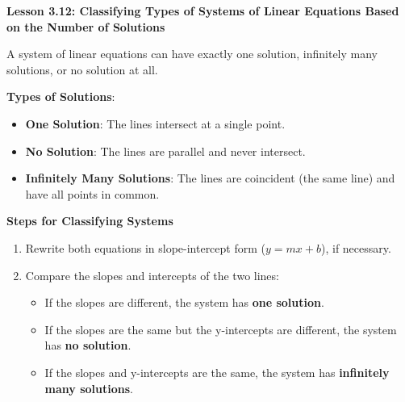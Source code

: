  \begin{center}
\textbf{Lesson 3.12: Classifying Types of Systems of Linear Equations Based on the Number of Solutions}
\end{center}

\vspace*{-2ex}

A system of linear equations can have exactly one solution, infinitely many solutions, or no solution at all.

\noindent\textbf{Types of Solutions}:
    \begin{itemize}
        \item \textbf{One Solution}: The lines intersect at a single point.
        \item \textbf{No Solution}: The lines are parallel and never intersect.
        \item \textbf{Infinitely Many Solutions}: The lines are coincident (the same line) and have all points in common.
    \end{itemize}

\noindent\textbf{Steps for Classifying Systems}

\begin{enumerate}
    \item Rewrite both equations in slope-intercept form ($y = mx + b$), if necessary.
    \item Compare the slopes and intercepts of the two lines:
    \begin{itemize}
        \item If the slopes are different, the system has \textbf{one solution}.
        \item If the slopes are the same but the y-intercepts are different, the system has \textbf{no solution}.
        \item If the slopes and y-intercepts are the same, the system has \textbf{infinitely many solutions}.
    \end{itemize}
\end{enumerate}

